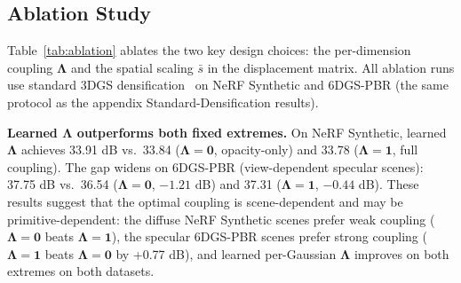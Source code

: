 \documentclass{article}
\theoremstyle{plain}
\theoremstyle{definition}
\theoremstyle{remark}
\begin{document}
\begin{table}[!t]
\centering
\caption{Ablation study on NeRF Synthetic and 6DGS-PBR datasets. $\Lambda{=}0$ corresponds to \textit{d}GS-O (opacity only), $\Lambda{=}1$ fixes full coupling, and learned $\Lambda$ is the full \textit{d}GS. ``w/o $\bar{s}$'' removes spatial scaling from displacement.}
\label{tab:ablation}
\setlength{\tabcolsep}{4pt}
%
\vspace{-1em}
\end{table}

\subsection{Ablation Study}

Table~\ref{tab:ablation} ablates the two key design choices: the per-dimension coupling $\boldsymbol{\Lambda}$ and the spatial scaling $\bar{s}$ in the displacement matrix. All ablation runs use standard 3DGS densification~\citep{3dgs} on NeRF Synthetic and 6DGS-PBR (the same protocol as the appendix Standard-Densification results).

\textbf{Learned $\boldsymbol{\Lambda}$ outperforms both fixed extremes.} On NeRF Synthetic, learned $\boldsymbol{\Lambda}$ achieves 33.91 dB vs.\ 33.84 ($\boldsymbol{\Lambda}{=}\mathbf{0}$, opacity-only) and 33.78 ($\boldsymbol{\Lambda}{=}\mathbf{1}$, full coupling). The gap widens on 6DGS-PBR (view-dependent specular scenes): 37.75 dB vs.\ 36.54 ($\boldsymbol{\Lambda}{=}\mathbf{0}$, $-1.21$ dB) and 37.31 ($\boldsymbol{\Lambda}{=}\mathbf{1}$, $-0.44$ dB). These results suggest that the optimal coupling is scene-dependent and may be primitive-dependent: the diffuse NeRF Synthetic scenes prefer weak coupling ($\boldsymbol{\Lambda}{=}\mathbf{0}$ beats $\boldsymbol{\Lambda}{=}\mathbf{1}$), the specular 6DGS-PBR scenes prefer strong coupling ($\boldsymbol{\Lambda}{=}\mathbf{1}$ beats $\boldsymbol{\Lambda}{=}\mathbf{0}$ by +0.77 dB), and learned per-Gaussian $\boldsymbol{\Lambda}$ improves on both extremes on both datasets.
\end{document}
